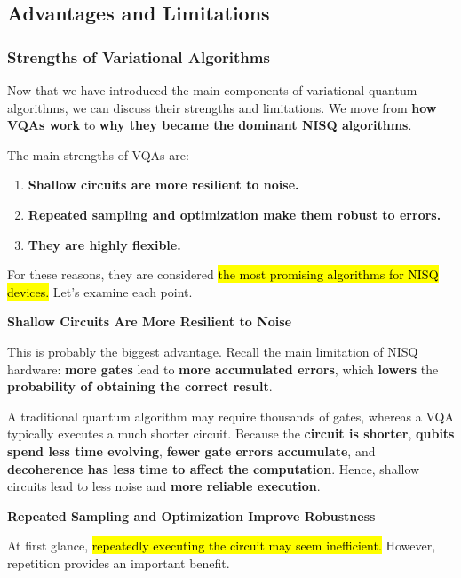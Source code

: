 \subsection{Advantages and Limitations}\label{sec:advantages-and-limitations}

\subsubsection{Strengths of Variational Algorithms}\label{sec:strengths-of-variational-algorithms}

Now that we have introduced the main components of variational quantum algorithms, we can discuss their strengths and limitations. We move from \textbf{how VQAs work} to \textbf{why they became the dominant NISQ algorithms}.

\highspace
The main strengths of VQAs are:
\begin{enumerate}
    \item \textbf{Shallow circuits are more resilient to noise.}
    \item \textbf{Repeated sampling and optimization make them robust to errors.}
    \item \textbf{They are highly flexible.}
\end{enumerate}
For these reasons, they are considered \hl{the most promising algorithms for NISQ devices.} Let's examine each point.

\highspace
\begin{flushleft}
    \textcolor{Green3}{ \textbf{Shallow Circuits Are More Resilient to Noise}}
\end{flushleft}
This is probably the biggest advantage. Recall the main limitation of NISQ hardware: \textbf{more gates} lead to \textbf{more accumulated errors}, which \textbf{lowers} the \textbf{probability of obtaining the correct result}.

\highspace
A traditional quantum algorithm may require thousands of gates, whereas a VQA typically executes a much shorter circuit. Because the \textbf{circuit is shorter}, \textbf{qubits spend less time evolving}, \textbf{fewer gate errors accumulate}, and \textbf{decoherence has less time to affect the computation}. Hence, shallow circuits lead to less noise and \textbf{more reliable execution}.

\highspace
\begin{flushleft}
    \textcolor{Green3}{ \textbf{Repeated Sampling and Optimization Improve Robustness}}
\end{flushleft}
At first glance, \hl{repeatedly executing the circuit may seem inefficient.} However, repetition provides an important benefit.


